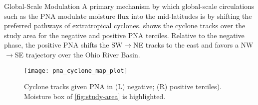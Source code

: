 \begin{block}{Global-Scale Modulation}
    A primary mechanism by which global-scale circulations such as the PNA modulate moisture flux into the mid-latitudes is by shifting the preferred pathways of extratropical cyclones.
     shows the cyclone tracks over the study area for the negative and positive PNA terciles.
    Relative to the negative phase, the positive PNA shifts the SW$\rightarrow$NE tracks to the east and favors a NW$\rightarrow$SE trajectory over the Ohio River Basin.
    \begin{figure}
        \texttt{[image: pna\_cyclone\_map\_plot]}
        \caption{Cyclone tracks given PNA in (L) negative; (R) positive terciles). Moisture box of \cref{fig:study-area} is highlighted.}
        \label{fig:track-given-pna}
    \end{figure}
\end{block}
